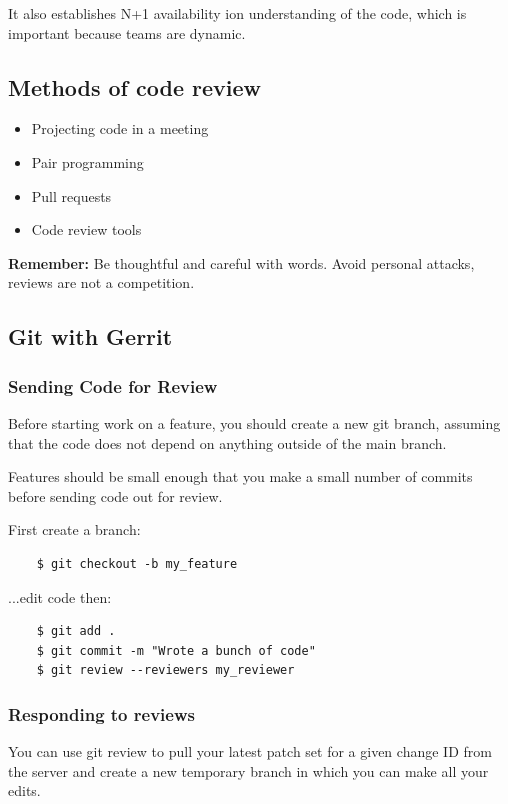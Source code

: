 \documentclass{article}
\begin{document}
It also establishes N+1 availability ion understanding of the code, which is important because teams are dynamic.

\subsection{Methods of code review}
\begin{itemize}
    \item Projecting code in a meeting
    \item Pair programming
    \item Pull requests
    \item Code review tools
\end{itemize}

\textbf{Remember:} Be thoughtful and careful with words. Avoid personal attacks, reviews are not a competition.

\subsection{Git with Gerrit}

\subsubsection*{Sending Code for Review}

Before starting work on a feature, you should create a new git branch, assuming that the code does not depend on anything outside of the main branch. 

Features should be small enough that you make a small number of commits before sending code out for review.

First create a branch:
\begin{verbatim}
    $ git checkout -b my_feature 
\end{verbatim}

...edit code then:
\begin{verbatim}
    $ git add .
    $ git commit -m "Wrote a bunch of code"
    $ git review --reviewers my_reviewer
\end{verbatim}

\subsubsection*{Responding to reviews }

You can use git review to pull your latest patch set for a given change ID from the server and create a new temporary branch in which you can make all your edits. 
\end{document}
